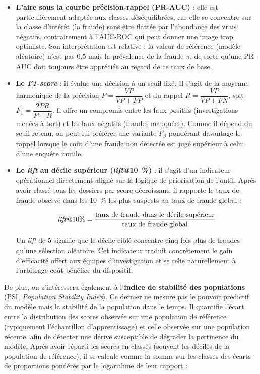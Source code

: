 \begin{itemize}[label = $\bullet$]
    \item \textbf{L'aire sous la courbe précision-rappel (PR-AUC)} : elle est particulièrement adaptée aux classes déséquilibrées, car elle se concentre sur la classe d'intérêt (la fraude) sans être flattée par l'abondance des vrais négatifs, contrairement à l'AUC-ROC qui peut donner une image trop optimiste. Son interprétation est relative : la valeur de référence (modèle aléatoire) n'est pas 0,5 mais la prévalence de la fraude $\pi$, de sorte qu'une PR-AUC doit toujours être appréciée au regard de ce taux de base.
    \item \textbf{Le \textit{F1-score}} : il évalue une décision à un seuil fixé. Il s'agit de la moyenne harmonique de la précision $P = \dfrac{VP}{VP + FP}$ et du rappel $R = \dfrac{VP}{VP + FN}$, soit $F_1 = \dfrac{2PR}{P + R}$. Il offre un compromis entre les faux positifs (investigations menées à tort) et les faux négatifs (fraudes manquées). Comme il dépend du seuil retenu, on peut lui préférer une variante $F_\beta$ pondérant davantage le rappel lorsque le coût d'une fraude non détectée est jugé supérieur à celui d'une enquête inutile.
    \item \textbf{Le \textit{lift} au décile supérieur (\textit{lift}@10~\%)} : il s'agit d'un indicateur opérationnel directement aligné sur la logique de priorisation de l'outil. Après avoir classé tous les dossiers par score décroissant, il rapporte le taux de fraude observé dans les 10~\% les plus suspects au taux de fraude global : 
    
    \begin{equation}
        \text{\textit{lift}@10\%} = \dfrac{\text{taux de fraude dans le décile supérieur}}{\text{taux de fraude global}}
    \end{equation}
    
    Un \textit{lift} de 5 signifie que le décile ciblé concentre cinq fois plus de fraudes qu'une sélection aléatoire. Cet indicateur traduit concrètement le gain d'efficacité offert aux équipes d'investigation et se relie naturellement à l'arbitrage coût-bénéfice du dispositif. 
\end{itemize}

De plus, on s'intéressera également à l'\textbf{indice de stabilité des populations} (PSI, \textit{Population Stability Index}). Ce dernier ne mesure pas le pouvoir prédictif du modèle mais la stabilité de la population dans le temps. Il quantifie l'écart entre la distribution des scores observée sur une population de référence (typiquement l'échantillon d'apprentissage) et celle observée sur une population récente, afin de détecter une dérive susceptible de dégrader la pertinence du modèle. Après avoir réparti les scores en classes (souvent les déciles de la population de référence), il se calcule comme la somme sur les classes des écarts de proportions pondérés par le logarithme de leur rapport :

